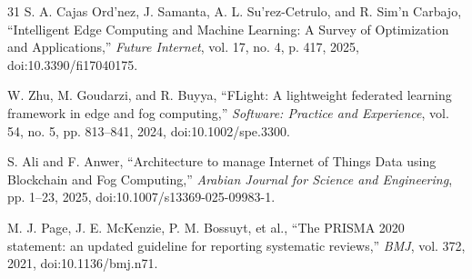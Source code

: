 \documentclass[conference]{IEEEtran}
\begin{document}
\begin{thebibliography}{31}
 S. A. Cajas Ord\a'nez, J. Samanta, A. L. Su\a'rez-Cetrulo, and R. Sim\a'n Carbajo, ``Intelligent Edge Computing and Machine Learning: A Survey of Optimization and Applications,'' \emph{Future Internet}, vol. 17, no. 4, p. 417, 2025, doi:10.3390/fi17040175.

 W. Zhu, M. Goudarzi, and R. Buyya, ``FLight: A lightweight federated learning framework in edge and fog computing,'' \emph{Software: Practice and Experience}, vol. 54, no. 5, pp. 813--841, 2024, doi:10.1002/spe.3300.

 S. Ali and F. Anwer, ``Architecture to manage Internet of Things Data using Blockchain and Fog Computing,'' \emph{Arabian Journal for Science and Engineering}, pp. 1--23, 2025, doi:10.1007/s13369-025-09983-1.

 M. J. Page, J. E. McKenzie, P. M. Bossuyt, et al., ``The PRISMA 2020 statement: an updated guideline for reporting systematic reviews,'' \emph{BMJ}, vol. 372, 2021, doi:10.1136/bmj.n71.

\end{thebibliography}
\end{document}
